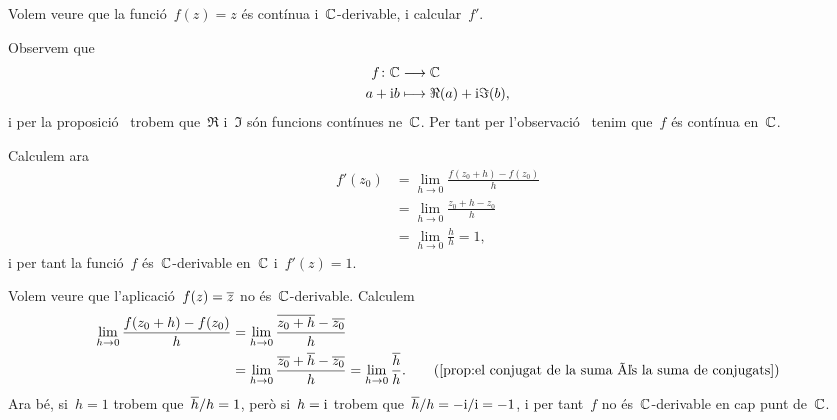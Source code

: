\documentclass[../Apunts.tex]{subfiles}
\begin{document}
	\begin{example}
		Volem veure que la funció~\(f(z)=z\) és contínua i~\(\mathbb{C}\)-derivable, i calcular~\(f'\).
		\begin{solution}
			Observem que
			\begin{align*}
				f\colon\mathbb{C}&\longrightarrow\mathbb{C} \\
				a+\mathrm{i} b&\longmapsto \Re(a)+\mathrm{i}\Im(b),
			\end{align*}
			i per la proposició~ trobem que~\(\Re\) i~\(\Im\) són funcions contínues ne~\(\mathbb{C}\). Per tant per l'observació~ tenim que~\(f\) és contínua en~\(\mathbb{C}\).
			
			Calculem ara
			\begin{align*}
				f'(z_{0})&=\lim_{h\to0}\frac{f(z_{0}+h)-f(z_{0})}{h} \\
				&=\lim_{h\to0}\frac{z_{0}+h-z_{0}}{h} \\
				&=\lim_{h\to0}\frac{h}{h}=1,
			\end{align*}
			i per tant la funció~\(f\) és~\(\mathbb{C}\)-derivable en~\(\mathbb{C}\) i~\(f'(z)=1\).
		\end{solution}
	\end{example}
	\begin{example}
		Volem veure que l'aplicació~\(f(z)=\overline{z}\) no és~\(\mathbb{C}\)-derivable. Calculem
		\begin{align*}
			\lim_{h\to0}\frac{f(z_{0}+h)-f(z_{0})}{h}&=\lim_{h\to0}\frac{\conjugat{z_{0}+h}-\conjugat{z_{0}}}{h} \\
			&=\lim_{h\to0}\frac{\conjugat{z_{0}}+\conjugat{h}-\conjugat{z_{0}}}{h}=\lim_{h\to0}\frac{\conjugat{h}}{h}. \tag{\ref{prop:el conjugat de la suma és la suma de conjugats}}
		\end{align*}
		Ara bé, si~\(h=1\) trobem que~\(\overline{h}/h=1\), però si~\(h=\mathrm{i}\) trobem que~\(\overline{h}/h=-\mathrm{i}/\mathrm{i}=-1\), i per tant~\(f\) no és~\(\mathbb{C}\)-derivable en cap punt de~\(\mathbb{C}\).
	\end{example}
\end{document}
